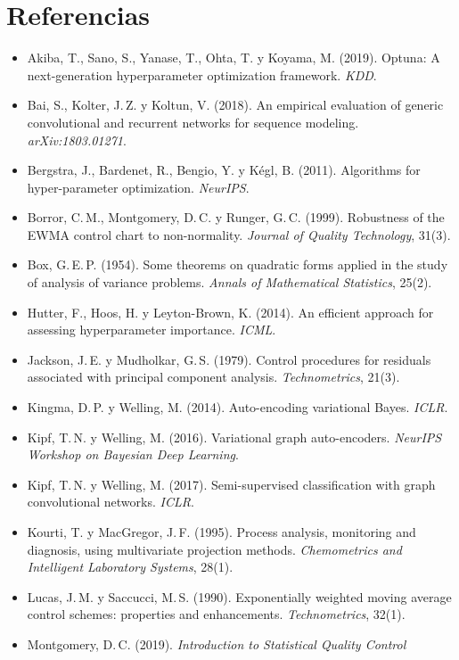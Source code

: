\documentclass[11pt,a4paper]{article}
\begin{document}
\section*{Referencias}
\begin{itemize}[leftmargin=*,label={}]
\item Akiba, T., Sano, S., Yanase, T., Ohta, T. y Koyama, M. (2019). Optuna: A
  next-generation hyperparameter optimization framework. \emph{KDD}.
\item Bai, S., Kolter, J.\,Z. y Koltun, V. (2018). An empirical evaluation of generic
  convolutional and recurrent networks for sequence modeling. \emph{arXiv:1803.01271}.
\item Bergstra, J., Bardenet, R., Bengio, Y. y Kégl, B. (2011). Algorithms for
  hyper-parameter optimization. \emph{NeurIPS}.
\item Borror, C.\,M., Montgomery, D.\,C. y Runger, G.\,C. (1999). Robustness of the
  EWMA control chart to non-normality. \emph{Journal of Quality Technology}, 31(3).
\item Box, G.\,E.\,P. (1954). Some theorems on quadratic forms applied in the study of
  analysis of variance problems. \emph{Annals of Mathematical Statistics}, 25(2).
\item Hutter, F., Hoos, H. y Leyton-Brown, K. (2014). An efficient approach for
  assessing hyperparameter importance. \emph{ICML}.
\item Jackson, J.\,E. y Mudholkar, G.\,S. (1979). Control procedures for residuals
  associated with principal component analysis. \emph{Technometrics}, 21(3).
\item Kingma, D.\,P. y Welling, M. (2014). Auto-encoding variational Bayes.
  \emph{ICLR}.
\item Kipf, T.\,N. y Welling, M. (2016). Variational graph auto-encoders.
  \emph{NeurIPS Workshop on Bayesian Deep Learning}.
\item Kipf, T.\,N. y Welling, M. (2017). Semi-supervised classification with graph
  convolutional networks. \emph{ICLR}.
\item Kourti, T. y MacGregor, J.\,F. (1995). Process analysis, monitoring and
  diagnosis, using multivariate projection methods. \emph{Chemometrics and Intelligent
  Laboratory Systems}, 28(1).
\item Lucas, J.\,M. y Saccucci, M.\,S. (1990). Exponentially weighted moving average
  control schemes: properties and enhancements. \emph{Technometrics}, 32(1).
\item Montgomery, D.\,C. (2019). \emph{Introduction to Statistical Quality Control}

\end{itemize}
\end{document}
